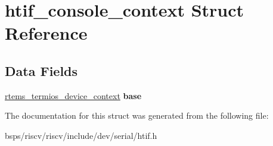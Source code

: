 \hypertarget{structhtif__console__context}{}\section{htif\+\_\+console\+\_\+context Struct Reference}
\label{structhtif__console__context}
\subsection*{Data Fields}
\begin{DoxyCompactItemize}
\item 
\mbox{\label{structhtif__console__context_a82e65a1ed70fca93da0f9b48cf345b68}} 
\mbox{\hyperlink{structrtems__termios__device__context}{rtems\+\_\+termios\+\_\+device\+\_\+context}} {\bfseries base}
\end{DoxyCompactItemize}


The documentation for this struct was generated from the following file\+:\begin{DoxyCompactItemize}
\item 
bsps/riscv/riscv/include/dev/serial/htif.\+h\end{DoxyCompactItemize}
